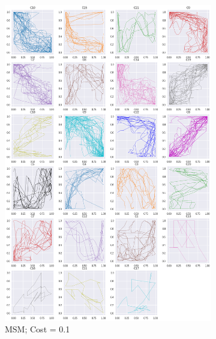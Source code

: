 \begin{figure}[h]
  \begin{subfigure}[c]{0.35\linewidth}
     \includegraphics[width=\linewidth]{figs/clusters/CLU_H_ALL[MSM;c=.1].png}
    \caption{MSM; Cost = 0.1}
  \end{subfigure}
  \hspace{.5em}
    \begin{subfigure}[c]{0.35\linewidth}

\end{subfigure}
\end{figure}
